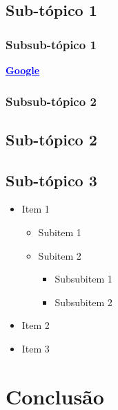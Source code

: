 \documentclass{article}
\begin{document}
\subsection{Sub-tópico 1}
\lipsum[1]

\subsubsection{Subsub-tópico 1}
\lipsum[1]

\href{https://www.google.com}{\textbf{\textcolor{blue}{\underline{Google}}}}

\subsubsection{Subsub-tópico 2}
\lipsum[1]

\subsection{Sub-tópico 2}
\lipsum[2]

\subsection{Sub-tópico 3}
\lipsum[3]

\begin{itemize}
    \item Item 1
    \begin{itemize}
        \item Subitem 1
        \item Subitem 2
        \begin{itemize}
            \item Subsubitem 1
            \item Subsubitem 2
        \end{itemize}
    \end{itemize}
    \item Item 2
    \item Item 3
\end{itemize}

\section{Conclusão}
\lipsum[3]
\end{document}
